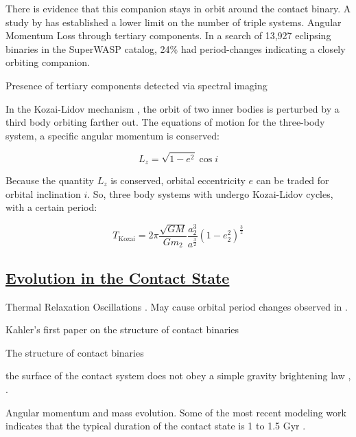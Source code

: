 \documentclass[12pt]{article} %
\numberwithin{equation}{section} %
\begin{document}
There is evidence that this companion stays in orbit around the contact binary.
A study by \citet{pribulla2006contact} has established a lower limit on the number of triple systems. Angular Momentum Loss through tertiary components.  \citep{lohr2015orbital} In a search of 13,927 eclipsing binaries in the SuperWASP catalog, 24\% had period-changes indicating a closely orbiting companion.

Presence of tertiary components detected via spectral imaging \citep{hendry1998detection}

In the Kozai-Lidov mechanism , the orbit of two inner bodies is perturbed by a third body orbiting farther out. The equations of motion for the three-body system, a specific angular momentum is conserved:

\begin{equation} \label{kozai_1}
L_{z} = \sqrt{1- e^{2}} \cos i
\end{equation}

Because the quantity $L_{z}$ is conserved, orbital eccentricity $e$ can be traded for orbital inclination $i$. So, three body systems with undergo Kozai-Lidov cycles, with a certain period:

\begin{equation} \label{kozai_2}
T_{\text{Kozai}} = 2 \pi \frac{\sqrt{GM}}{G m_{2}} \frac{a_{2}^{3}}{a^{\frac{3}{2}}} (1 - e^{2}_{2})^{\frac{3}{2}}
\end{equation}

\subsection[Evolution in the Contact State]{\hyperlink{toc}{Evolution in the Contact State}}

Thermal Relaxation Oscillations \citep{wang1994thermal}. May cause orbital period changes observed in \citet{qian2001orbital}.

Kahler's first paper on the structure of contact binaries \citep{kahler2002structure}

The structure of contact binaries \citep{kahler2004structure}

the surface of the contact system does not obey a simple gravity brightening law \citep{kahler2004structure}, \citep{hilditch1988evolutionary}.

\citep{rubenstein2001effect}

Angular momentum and mass evolution. Some of the most recent modeling work indicates that the typical duration of the contact state is 1 to 1.5 Gyr \citep{gazeas2008angular}.
\end{document}
